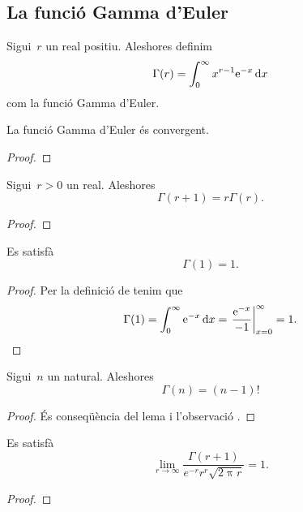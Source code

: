\documentclass[../../main.tex]{subfiles}
\begin{document}
	\subsection{La funció Gamma d'Euler}
	\begin{definition}
		\label{def:Gamma d'Euler}
		Sigui~\(r\) un real positiu.
		Aleshores definim
		\[
		    \Gamma(r)=\int_{0}^{\infty}x^{r-1}\mathrm{e}^{-x}\mathop{}\!\mathrm{d} x
		\]
		com la funció Gamma d'Euler.
	\end{definition}
	\begin{theorem}
		\label{thm:la funció Gamma d'Euler és convergent}
		La funció Gamma d'Euler és convergent.
		\begin{proof}
		\end{proof}
	\end{theorem}
	\begin{lemma} %
		\label{lema:la Gamma d'Euler es comporta com un factorial amb reals}
		Sigui~\(r>0\) un real.
		Aleshores
		\[
		    \Gamma(r+1)=r\Gamma(r).
		\]
		\begin{proof}
		\end{proof}
	\end{lemma}
	\begin{observation}
		\label{obs:valor n=1 per la Gamma d'Euler}
		Es satisfà
		\[
		    \Gamma(1)=1.
		\]
		\begin{proof} %
			Per la definició de  tenim que
			\[
			    \Gamma(1)=\int_{0}^{\infty}\e^{-x}\diff x=\left.\frac{\e^{-x}}{-1}\right\vert_{x=0}^{\infty}=1.\qedhere
			\]
		\end{proof}
	\end{observation}
	\begin{lemma} %
		\label{lema:la Gamma d'Euler es comporta com un factorial}
		Sigui~\(n\) un natural.
		Aleshores
		\[
		    \Gamma(n)=(n-1)!
		\]
		\begin{proof}
			És conseqüència del lema  i l'observació .
		\end{proof}
	\end{lemma}
	\begin{theorem}
		\label{thm:fórmula d'Stirling}
		Es satisfà
		\[
		    \lim_{r\to\infty}\frac{\Gamma(r+1)}{e^{-r}r^{r}\sqrt{2\uppi r}}=1.
		\]
		\begin{proof}
		\end{proof}
	\end{theorem}
\end{document}
